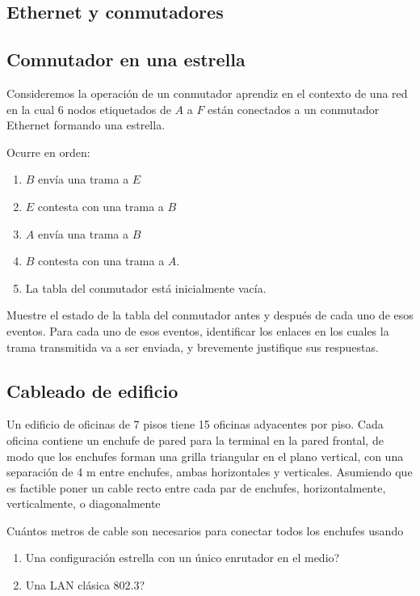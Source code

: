 \documentclass[12pt]{report}
\begin{document}
\begin{exer}
	\section{Ethernet y conmutadores}
	\subsection{Comnutador en una estrella \sthree}
	Consideremos la operación de un conmutador aprendiz en el contexto de una red en la cual 6 nodos etiquetados de $A$ a $F$ están conectados a un conmutador Ethernet formando una estrella.

	Ocurre en orden:
	\begin{enumerate}
		\item $B$ envía una trama a $E$
		\item $E$ contesta con una trama a $B$
		\item $A$ envía una trama a $B$
		\item $B$ contesta con una trama a $A$.
		\item La tabla del conmutador está inicialmente vacía.
	\end{enumerate}

	Muestre el estado de la tabla del conmutador antes y después de cada uno de esos eventos. Para cada uno de esos eventos, identificar los enlaces en los cuales la trama transmitida va a ser enviada, y brevemente justifique sus respuestas.
\end{exer}

\begin{exer}
	\subsection{Cableado de edificio \stwo}
	Un edificio de oficinas de 7 pisos tiene 15 oficinas adyacentes por piso. Cada oficina contiene un enchufe de pared para la terminal en la pared frontal, de modo que los enchufes forman una grilla triangular en el plano vertical, con una separación de 4 m entre enchufes, ambas horizontales y verticales. Asumiendo que es factible poner un cable recto entre cada par de enchufes, horizontalmente, verticalmente, o diagonalmente

	Cuántos metros de cable son necesarios para conectar todos los enchufes usando

	\begin{enumerate}
		\item Una configuración estrella con un único enrutador en el medio?
		\item Una LAN clásica 802.3?
	\end{enumerate}
\end{exer}
\end{document}
